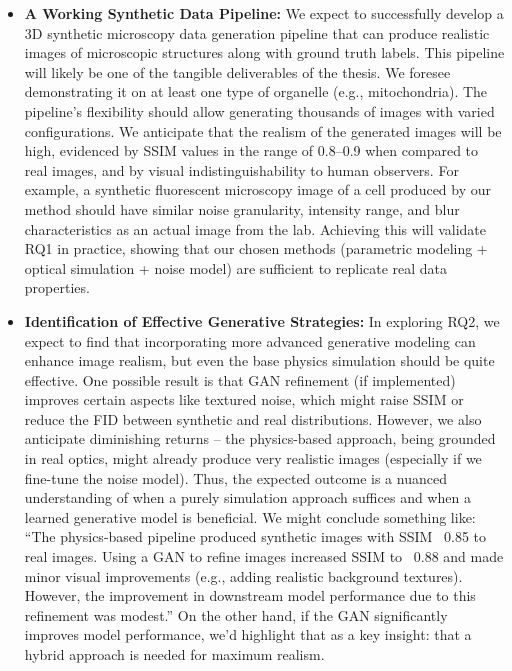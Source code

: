 \documentclass[
oneside,      %
openany       %
]{imc-inf}
\begin{document}
	\begin{itemize}
		\item \textbf{A Working Synthetic Data Pipeline:} We expect to successfully develop a 3D synthetic microscopy data generation pipeline that can produce realistic images of microscopic structures along with ground truth labels. This pipeline will likely be one of the tangible deliverables of the thesis. We foresee demonstrating it on at least one type of organelle (e.g., mitochondria). The pipeline’s flexibility should allow generating thousands of images with varied configurations. We anticipate that the realism of the generated images will be high, evidenced by SSIM values in the range of 0.8–0.9 when compared to real images, and by visual indistinguishability to human observers. For example, a synthetic fluorescent microscopy image of a cell produced by our method should have similar noise granularity, intensity range, and blur characteristics as an actual image from the lab. Achieving this will validate RQ1 in practice, showing that our chosen methods (parametric modeling + optical simulation + noise model) are sufficient to replicate real data properties.
		
		\item \textbf{Identification of Effective Generative Strategies:} In exploring RQ2, we expect to find that incorporating more advanced generative modeling can enhance image realism, but even the base physics simulation should be quite effective. One possible result is that GAN refinement (if implemented) improves certain aspects like textured noise, which might raise SSIM or reduce the FID between synthetic and real distributions. However, we also anticipate diminishing returns – the physics-based approach, being grounded in real optics, might already produce very realistic images (especially if we fine-tune the noise model). Thus, the expected outcome is a nuanced understanding of when a purely simulation approach suffices and when a learned generative model is beneficial. We might conclude something like: “The physics-based pipeline produced synthetic images with SSIM ~0.85 to real images. Using a GAN to refine images increased SSIM to ~0.88 and made minor visual improvements (e.g., adding realistic background textures). However, the improvement in downstream model performance due to this refinement was modest.” On the other hand, if the GAN significantly improves model performance, we’d highlight that as a key insight: that a hybrid approach is needed for maximum realism.
		

\end{itemize}
\end{document}

